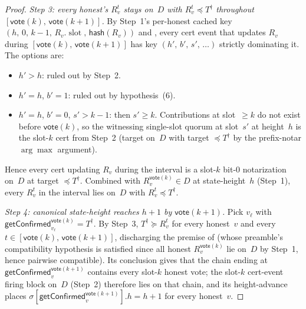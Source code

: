 \documentclass{article}
\newcommand{\slot}[0]{\ensuremath{\operatorname{\mathrm{slot}}}}
\newcommand{\hash}{\mathsf{hash}}
\newcommand{\vote}{\mathsf{vote}}
\newcommand{\getConfirmed}{\textsf{getConfirmed}\xspace}
\theoremstyle{plain}
\theoremstyle{definition}
\theoremstyle{remark}
\begin{document}
\begin{proof}
\emph{Step 3: every honest's $R_v^t$ stays on~$D$ with $R_v^t \preceq T^\dagger$ throughout $[\vote(k),\, \vote(k+1)]$.}
By Step~1's per-honest cached key $(h,\, 0,\, k-1,\, R_v.\slot,\, \hash(R_v))$ and , every cert event that updates $R_v$ during $[\vote(k),\, \vote(k+1)]$ has key $(h',\, b',\, s',\, \ldots)$ strictly dominating it. The options are:
\begin{itemize}
  \item $h' > h$: ruled out by Step~2.
  \item $h' = h$, $b' = 1$: ruled out by hypothesis~(6).
  \item $h' = h$, $b' = 0$, $s' > k-1$: then $s' \geq k$. Contributions at slot~$\geq k$ do not exist before $\vote(k)$, so the witnessing single-slot quorum at slot~$s'$ at height~$h$ is the slot-$k$ cert from Step~2 (target on~$D$ with target $\preceq T^\dagger$ by the prefix-notar $\arg\max$ argument).
\end{itemize}
Hence every cert updating $R_v$ during the interval is a slot-$k$ bit-$0$ notarization on~$D$ at target $\preceq T^\dagger$. Combined with $R_v^{\vote(k)} \in D$ at state-height~$h$ (Step~1), every $R_v^t$ in the interval lies on~$D$ with $R_v^t \preceq T^\dagger$.

\emph{Step 4: canonical state-height reaches $h+1$ by $\vote(k+1)$.}
Pick $v_\ell$ with $\getConfirmed_{v_\ell}^{\vote(k)} = T^\dagger$. By Step~3, $T^\dagger \succeq R_v^t$ for every honest~$v$ and every $t \in [\vote(k),\, \vote(k+1)]$, discharging the premise of  (whose preamble's compatibility hypothesis is satisfied since all honest $R_v^{\vote(k)}$ lie on~$D$ by Step~1, hence pairwise compatible). Its conclusion gives that the chain ending at $\getConfirmed_v^{\vote(k+1)}$ contains every slot-$k$ honest vote; the slot-$k$ cert-event firing block on~$D$ (Step~2) therefore lies on that chain, and its height-advance places $\sigma[\getConfirmed_v^{\vote(k+1)}].h = h + 1$ for every honest~$v$.


\end{proof}
\end{document}
